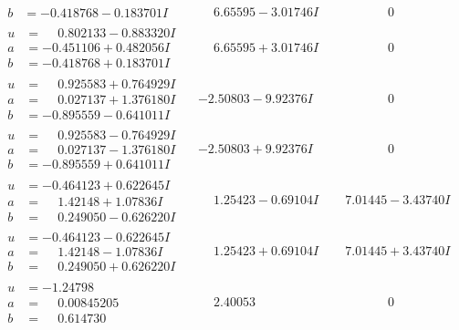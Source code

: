 \documentclass[1p]{elsarticle_modified}
\theoremstyle{definition}
\begin{document}
$$\begin{array}{c|c|c}
\begin{aligned}
b &= -0.418768 - 0.183701 I\end{aligned}
 & \phantom{-}6.65595 - 3.01746 I & \phantom{-0.000000 } 0 \\ \hline\begin{aligned}
u &= \phantom{-}0.802133 - 0.883320 I \\
a &= -0.451106 + 0.482056 I \\
b &= -0.418768 + 0.183701 I\end{aligned}
 & \phantom{-}6.65595 + 3.01746 I & \phantom{-0.000000 } 0 \\ \hline\begin{aligned}
u &= \phantom{-}0.925583 + 0.764929 I \\
a &= \phantom{-}0.027137 + 1.376180 I \\
b &= -0.895559 - 0.641011 I\end{aligned}
 & -2.50803 - 9.92376 I & \phantom{-0.000000 } 0 \\ \hline\begin{aligned}
u &= \phantom{-}0.925583 - 0.764929 I \\
a &= \phantom{-}0.027137 - 1.376180 I \\
b &= -0.895559 + 0.641011 I\end{aligned}
 & -2.50803 + 9.92376 I & \phantom{-0.000000 } 0 \\ \hline\begin{aligned}
u &= -0.464123 + 0.622645 I \\
a &= \phantom{-}1.42148 + 1.07836 I \\
b &= \phantom{-}0.249050 - 0.626220 I\end{aligned}
 & \phantom{-}1.25423 - 0.69104 I & \phantom{-}7.01445 - 3.43740 I \\ \hline\begin{aligned}
u &= -0.464123 - 0.622645 I \\
a &= \phantom{-}1.42148 - 1.07836 I \\
b &= \phantom{-}0.249050 + 0.626220 I\end{aligned}
 & \phantom{-}1.25423 + 0.69104 I & \phantom{-}7.01445 + 3.43740 I \\ \hline\begin{aligned}
u &= -1.24798\phantom{ +0.000000I} \\
a &= \phantom{-}0.00845205\phantom{ +0.000000I} \\
b &= \phantom{-}0.614730\phantom{ +0.000000I}\end{aligned}
 & \phantom{-}2.40053\phantom{ +0.000000I} & \phantom{-0.000000 } 0 \\ \hline\begin{aligned}

\end{aligned}
\end{array}$$
\end{document}
